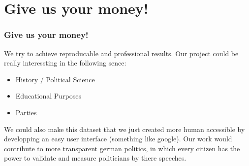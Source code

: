 \documentclass[11pt, a4paper]{beamer}
\begin{document}
\section{Give us your money!}
\begin{frame}
\frametitle{Give us your money!}
We try to achieve reproducable and professional results. Our project could be
really interessting in the following sence:
\begin{itemize}
\item History / Political Science  
\item Educational Purposes
\item Parties 
\end{itemize}
We could also make this dataset that we just created more human accessible by 
developping an easy user interface (something like google).
Our work would contribute to more transparent german politics, in which every 
citizen has the power to validate and measure politicians by there speeches. 
\end{frame}
\end{document}
